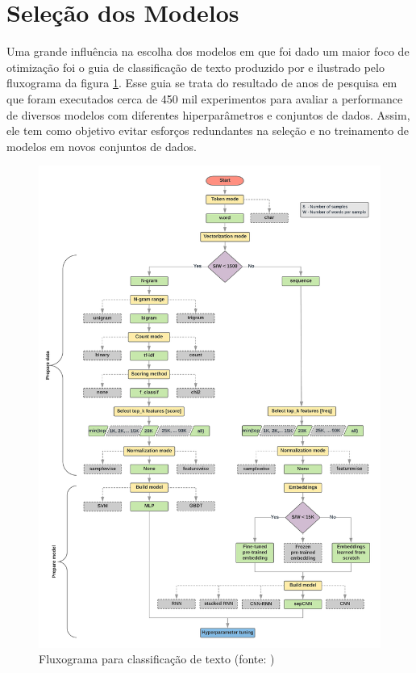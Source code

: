 \section{Seleção dos Modelos}

Uma grande influência na escolha dos modelos em que foi dado um maior foco de otimização foi o guia de classificação de texto produzido por \cite{Text_classification_guide} e ilustrado pelo fluxograma da figura \ref{fig:TextClassificationFlowchart}. Esse guia se trata do resultado de anos de pesquisa em que foram executados cerca de 450 mil experimentos para avaliar a performance de diversos modelos com diferentes hiperparâmetros e conjuntos de dados. Assim, ele tem como objetivo evitar esforços redundantes na seleção e no treinamento de modelos em novos conjuntos de dados.

\begin{figure}[!ht]
	\centering
	\includegraphics[width=1.0\textwidth]{figures/TextClassificationFlowchart.png}
	\caption{Fluxograma para classificação de texto (fonte: \cite{Text_classification_guide})}
	\label{fig:TextClassificationFlowchart}
\end{figure}

